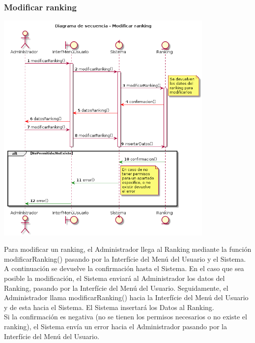 \subsubsection{Modificar ranking}
\begin{center}
  \includegraphics[width=0.8\textwidth]{./imatges/administrador/Modificar_ranking.png}
  \end{center}
  Para modificar un ranking, el Administrador llega al Ranking mediante la función modificarRanking() pasando por la Interfície del Menú del Usuario y el Sistema.
  \\A continuación se devuelve la confirmación hasta el Sistema. En el caso que sea posible la modificación, el Sistema enviará al Administrador los datos del Ranking, pasando por la Interfície del Menú del Usuario. Seguidamente, el Administrador llama modificarRanking() hacia la Interfície del Menú del Usuario y de esta hacia el Sistema. El Sistema insertará los Datos al Ranking.
  \\Si la confirmación es negativa (no se tienen los permisos necesarios o no existe el ranking), el Sistema envía un error hacia el Administrador pasando por la Interfície del Menú del Usuario.
  
